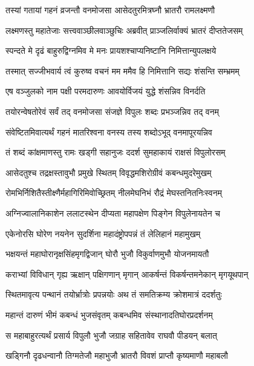 \twolineshloka
{तस्यां गतायां गहनं व्रजन्तौ वनमोजसा}
{आसेदतुरमित्रघ्नौ भ्रातरौ रामलक्ष्मणौ} %

\twolineshloka
{लक्ष्मणस्तु महातेजाः सत्त्ववाञ्छीलवाञ्छुचिः}
{अब्रवीत् प्राञ्जलिर्वाक्यं भ्रातरं दीप्ततेजसम्} %

\twolineshloka
{स्पन्दते मे दृढं बाहुरुद्विग्नमिव मे मनः}
{प्रायशश्चाप्यनिष्टानि निमित्तान्युपलक्षये} %

\twolineshloka
{तस्मात् सज्जीभवार्य त्वं कुरुष्व वचनं मम}
{ममैव हि निमित्तानि सद्यः शंसन्ति सम्भ्रमम्} %

\twolineshloka
{एष वञ्जुलको नाम पक्षी परमदारुणः}
{आवयोर्विजयं युद्धे शंसन्निव विनर्दति} %

\twolineshloka
{तयोरन्वेषतोरेवं सर्वं तद् वनमोजसा}
{संजज्ञे विपुलः शब्दः प्रभञ्जन्निव तद् वनम्} %

\twolineshloka
{संवेष्टितमिवात्यर्थं गहनं मातरिश्वना}
{वनस्य तस्य शब्दोऽभूद् वनमापूरयन्निव} %

\twolineshloka
{तं शब्दं कांक्षमाणस्तु रामः खड्गी सहानुजः}
{ददर्श सुमहाकायं राक्षसं विपुलोरसम्} %

\twolineshloka
{आसेदतुश्च तद्रक्षस्तावुभौ प्रमुखे स्थितम्}
{विवृद्धमशिरोग्रीवं कबन्धमुदरेमुखम्} %

\twolineshloka
{रोमभिर्निशितैस्तीक्ष्णैर्महागिरिमिवोच्छ्रितम्}
{नीलमेघनिभं रौद्रं मेघस्तनितनिःस्वनम्} %

\twolineshloka
{अग्निज्वालानिकाशेन ललाटस्थेन दीप्यता}
{महापक्षेण पिङ्गेन विपुलेनायतेन च} %

\twolineshloka
{एकेनोरसि घोरेण नयनेन सुदर्शिना}
{महादंष्ट्रोपपन्नं तं लेलिहानं महामुखम्} %

\twolineshloka
{भक्षयन्तं महाघोरानृक्षसिंहमृगद्विजान्}
{घोरौ भुजौ विकुर्वाणमुभौ योजनमायतौ} %

\twolineshloka
{कराभ्यां विविधान् गृह्य ऋक्षान् पक्षिगणान् मृगान्}
{आकर्षन्तं विकर्षन्तमनेकान् मृगयूथपान्} %

\twolineshloka
{स्थितमावृत्य पन्थानं तयोर्भ्रात्रोः प्रपन्नयोः}
{अथ तं समतिक्रम्य क्रोशमात्रं ददर्शतुः} %

\twolineshloka
{महान्तं दारुणं भीमं कबन्धं भुजसंवृतम्}
{कबन्धमिव संस्थानादतिघोरप्रदर्शनम्} %

\twolineshloka
{स महाबाहुरत्यर्थं प्रसार्य विपुलौ भुजौ}
{जग्राह सहितावेव राघवौ पीडयन् बलात्} %

\twolineshloka
{खड्गिनौ दृढधन्वानौ तिग्मतेजौ महाभुजौ}
{भ्रातरौ विवशं प्राप्तौ कृष्यमाणौ महाबलौ} %

